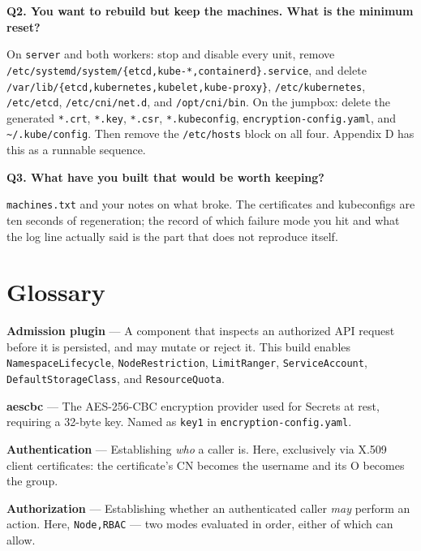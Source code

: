 \documentclass[11pt,oneside]{report}
\begin{document}
\textbf{Q2. You want
to rebuild but keep
the machines. What
is the minimum
reset?}

On \texttt{server}
and both workers:
stop and disable
every unit, remove
\texttt{/}\allowbreak{}\texttt{etc/}\allowbreak{}\texttt{systemd/}\allowbreak{}\texttt{system/}\allowbreak{}\texttt{\{etcd,kube-}\allowbreak{}\texttt{*,containerd\}.}\allowbreak{}\texttt{service},
and delete
\texttt{/}\allowbreak{}\texttt{var/}\allowbreak{}\texttt{lib/}\allowbreak{}\texttt{\{etcd,kubernetes,kubelet,kube-}\allowbreak{}\texttt{proxy\}},
\texttt{/etc/kubernetes},
\texttt{/etc/etcd},
\texttt{/etc/cni/net.d},
and
\texttt{/opt/cni/bin}.
On the jumpbox:
delete the generated
\texttt{*.crt},
\texttt{*.key},
\texttt{*.csr},
\texttt{*.kubeconfig},
\texttt{encryption-}\allowbreak{}\texttt{config.}\allowbreak{}\texttt{yaml},
and
\texttt{\textasciitilde{}/.kube/config}.
Then remove the
\texttt{/etc/hosts}
block on all four.
Appendix D has this
as a runnable
sequence.

\textbf{Q3. What
have you built that
would be worth
keeping?}

\texttt{machines.txt}
and your notes on
what broke. The
certificates and
kubeconfigs are ten
seconds of
regeneration; the
record of which
failure mode you hit
and what the log
line actually said
is the part that
does not reproduce
itself.

\appendix

\hypertarget{app-glossary}{%
\chapter{Glossary}\label{app-glossary}}

\textbf{Admission
plugin} --- A
component that
inspects an
authorized API
request before it is
persisted, and may
mutate or reject it.
This build enables
\texttt{NamespaceLifecycle},
\texttt{NodeRestriction},
\texttt{LimitRanger},
\texttt{ServiceAccount},
\texttt{DefaultStorageClass},
and
\texttt{ResourceQuota}.

\textbf{aescbc} ---
The AES-256-CBC
encryption provider
used for Secrets at
rest, requiring a
32-byte key. Named
as \texttt{key1} in
\texttt{encryption-}\allowbreak{}\texttt{config.}\allowbreak{}\texttt{yaml}.

\textbf{Authentication}
--- Establishing
\emph{who} a caller
is. Here,
exclusively via
X.509 client
certificates: the
certificate's CN
becomes the username
and its O becomes
the group.

\textbf{Authorization}
--- Establishing
whether an
authenticated caller
\emph{may} perform
an action. Here,
\texttt{Node,RBAC}
--- two modes
evaluated in order,
either of which can
allow.
\end{document}
